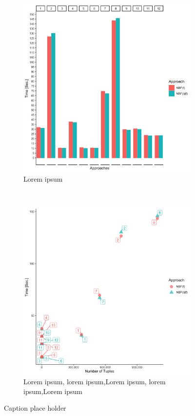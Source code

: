 \begin{figure}[t!]
    \centering
    \begin{subfigure}[t]{0.5\textwidth}
        \centering
        \includegraphics[scale=0.09]{figs/plots/emp-nbf-f.png}
        \caption{Lorem ipsum}
    \end{subfigure}%
    ~ 
    \begin{subfigure}[t]{0.5\textwidth}
        \centering
        \includegraphics[scale=0.09]{figs/plots/emp-nbf-f-scatter.png}
        \caption{Lorem ipsum, lorem ipsum,Lorem ipsum, lorem ipsum,Lorem ipsum}
    \end{subfigure}
    \caption{Caption place holder}
\end{figure}

